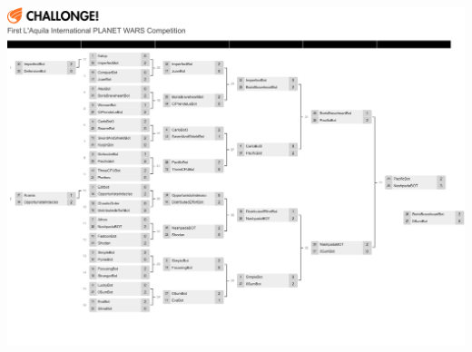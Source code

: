 \documentclass[12pt]{scrartcl}
\begin{document}
	\includegraphics[height=10.5in, width=7in]{1m1t694g.pdf}
	
\end{document}
